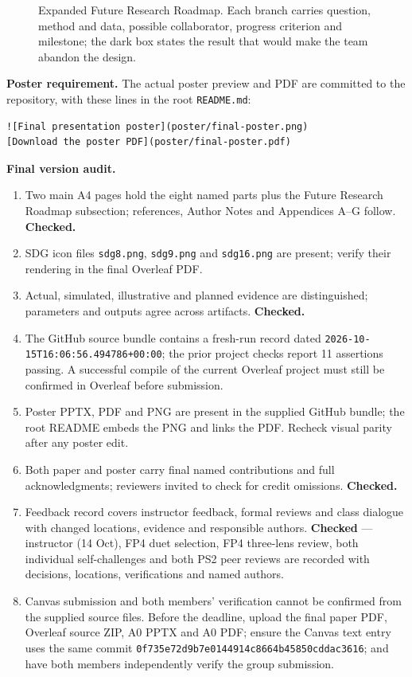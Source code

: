 \begin{figure}[H]\centering
\resizebox{0.86\textwidth}{!}{}
\caption{Expanded Future Research Roadmap. Each branch carries question, method and data, possible collaborator, progress criterion and milestone; the dark box states the result that would make the team abandon the design.}
\end{figure}

\textbf{Poster requirement.} The actual poster preview and PDF are committed to the repository, with these lines in the root \texttt{README.md}:
\begin{verbatim}
![Final presentation poster](poster/final-poster.png)
[Download the poster PDF](poster/final-poster.pdf)
\end{verbatim}

\textbf{Final version audit.}
\begin{enumerate}[nosep]
\item Two main A4 pages hold the eight named parts plus the Future Research Roadmap subsection; references, Author Notes and Appendices A--G follow. \textbf{Checked.}
\item SDG icon files \texttt{sdg8.png}, \texttt{sdg9.png} and \texttt{sdg16.png} are present; verify their rendering in the final Overleaf PDF.
\item Actual, simulated, illustrative and planned evidence are distinguished; parameters and outputs agree across artifacts. \textbf{Checked.}
\item The GitHub source bundle contains a fresh-run record dated \texttt{2026-10-15T16:06:56.494786+00:00}; the prior project checks report 11 assertions passing. A successful compile of the current Overleaf project must still be confirmed in Overleaf before submission.
\item Poster PPTX, PDF and PNG are present in the supplied GitHub bundle; the root README embeds the PNG and links the PDF. Recheck visual parity after any poster edit.
\item Both paper and poster carry final named contributions and full acknowledgments; reviewers invited to check for credit omissions. \textbf{Checked.}
\item Feedback record covers instructor feedback, formal reviews and class dialogue with changed locations, evidence and responsible authors. \textbf{Checked} --- instructor (14 Oct), FP4 duet selection, FP4 three-lens review, both individual self-challenges and both PS2 peer reviews are recorded with decisions, locations, verifications and named authors.
\item Canvas submission and both members' verification cannot be confirmed from the supplied source files. Before the deadline, upload the final paper PDF, Overleaf source ZIP, A0 PPTX and A0 PDF; ensure the Canvas text entry uses the same commit \texttt{0f735e72d9b7e0144914c8664b45850cddac3616}; and have both members independently verify the group submission.
\end{enumerate}

